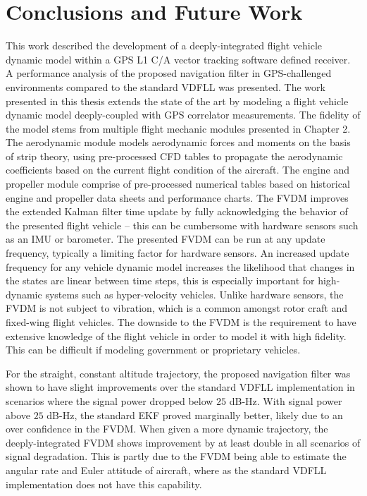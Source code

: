 \chapter{\textbf{Conclusions and Future Work}}
This work described the development of a deeply-integrated flight vehicle dynamic model within a GPS L1 C/A vector tracking software defined receiver. A performance analysis of the proposed navigation filter in GPS-challenged environments compared to the standard VDFLL was presented. The work presented in this thesis extends the state of the art by modeling a flight vehicle dynamic model deeply-coupled with GPS correlator measurements. The fidelity of the model stems from multiple flight mechanic modules presented in Chapter 2. The aerodynamic module models aerodynamic forces and moments on the basis of strip theory, using pre-processed CFD tables to propagate the aerodynamic coefficients based on the current flight condition of the aircraft. The engine and propeller module comprise of pre-processed numerical tables based on historical engine and propeller data sheets and performance charts. The FVDM improves the extended Kalman filter time update by fully acknowledging the behavior of the presented flight vehicle {--} this can be cumbersome with hardware sensors such as an IMU or barometer. The presented FVDM can be run at any update frequency, typically a limiting factor for hardware sensors. An increased update frequency for any vehicle dynamic model increases the likelihood that changes in the states are linear between time steps, this is especially important for high-dynamic systems such as hyper-velocity vehicles. Unlike hardware sensors, the FVDM is not subject to vibration, which is a common amongst rotor craft and fixed-wing flight vehicles. The downside to the FVDM is the requirement to have extensive knowledge of the flight vehicle in order to model it with high fidelity. This can be difficult if modeling government or proprietary vehicles.

For the straight, constant altitude trajectory, the proposed navigation filter was shown to have slight improvements over the standard VDFLL implementation in scenarios where the signal power dropped below \(25\) dB-Hz. With signal power above \(25\) dB-Hz, the standard EKF proved marginally better, likely due to an over confidence in the FVDM\@. When given a more dynamic trajectory, the deeply-integrated FVDM shows improvement by at least double in all scenarios of signal degradation. This is partly due to the FVDM being able to estimate the angular rate and Euler attitude of aircraft, where as the standard VDFLL implementation does not have this capability.

